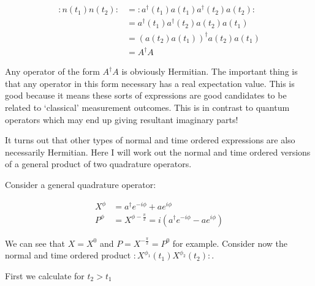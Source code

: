 \documentclass[12pt]{article}
\begin{document}
\begin{align}
:n(t_1)n(t_2): &= :a^{\dag}(t_1)a(t_1)a^{\dag}(t_2)a(t_2):\\
&= a^{\dag}(t_1)a^{\dag}(t_2)a(t_2)a(t_1)\\
&= \left(a(t_2)a(t_1)\right)^{\dag} a(t_2) a(t_1)\\
&= A^{\dag}A
\end{align} 

Any operator of the form $A^{\dag}A$ is obviously Hermitian. The important thing is that any operator in this form necessary has a real expectation value. This is good because it means these sorts of expressions are good candidates to be related to `classical' measurement outcomes. This is in contrast to quantum operators which may end up giving resultant imaginary parts!

It turns out that other types of normal and time ordered expressions are also necessarily Hermitian. Here I will work out the normal and time ordered versions of a general product of two quadrature operators.

Consider a general quadrature operator:

\begin{align}
X^{\phi} &= a^{\dag}e^{-i\phi} + ae^{i\phi}\\
P^{\phi} &= X^{\phi-\frac{\pi}{2}} = i(a^{\dag}e^{-i\phi} - ae^{i\phi})
\end{align}

We can see that $X = X^0$ and $P = X^{-\frac{\pi}{2}} = P^0$ for example. Consider now the normal and time ordered product $:X^{\phi_1}(t_1)X^{\phi_2}(t_2):$.

First we calculate for $t_2>t_1$
\end{document}
